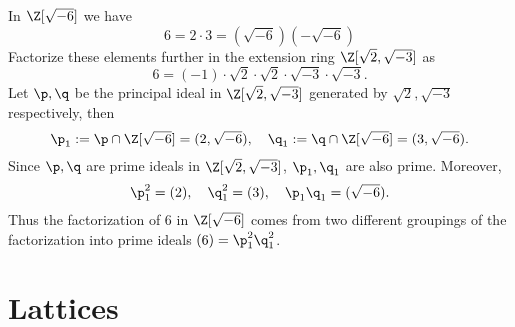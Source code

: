 \begin{example}
In $\Z[\sqrt{-6}]$ we have
\[6=2\cdot 3=(\sqrt{-6})(-\sqrt{-6})\]
Factorize these elements further in the extension ring $\Z[\sqrt{2},\sqrt{-3}]$ as
\[6=(-1)\cdot\sqrt{2}\cdot\sqrt{2}\cdot\sqrt{-3}\cdot\sqrt{-3}.\]
Let $\p,\q$ be the principal ideal in $\Z[\sqrt{2},\sqrt{-3}]$ generated by $\sqrt{2},\sqrt{-3}$ respectively, then
\[\p_1:=\p\cap\Z[\sqrt{-6}]=(2,\sqrt{-6}),\quad \q_1:=\q\cap\Z[\sqrt{-6}]=(3,\sqrt{-6}).\]
Since $\p,\q$ are prime ideals in $\Z[\sqrt{2},\sqrt{-3}]$, $\p_1,\q_1$ are also prime. Moreover,
\[\p_1^2=(2),\quad\q_1^2=(3),\quad\p_1\q_1=(\sqrt{-6}).\]
Thus the factorization of $6$ in $\Z[\sqrt{-6}]$ comes from two different groupings of the factorization into prime ideals $(6)=\p_1^2\q_1^2$.
\end{example}
\section{Lattices}
